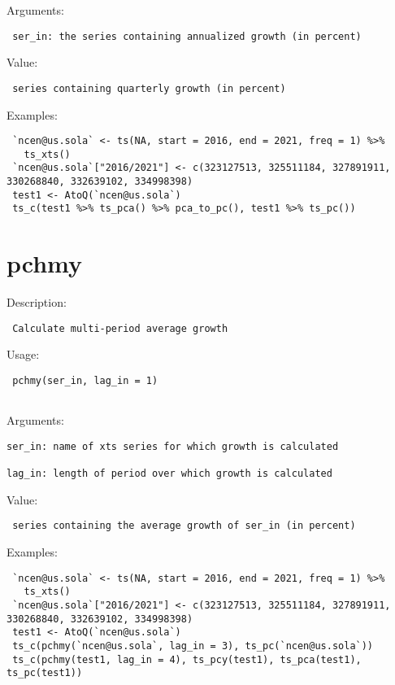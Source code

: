 \documentclass[
  letterpaper,
  DIV=11,
  numbers=noendperiod]{scrreport}
\begin{document}
Arguments:

\begin{verbatim}
 ser_in: the series containing annualized growth (in percent)
\end{verbatim}

Value:

\begin{verbatim}
 series containing quarterly growth (in percent)
\end{verbatim}

Examples:

\begin{verbatim}
 `ncen@us.sola` <- ts(NA, start = 2016, end = 2021, freq = 1) %>% 
   ts_xts()
 `ncen@us.sola`["2016/2021"] <- c(323127513, 325511184, 327891911, 330268840, 332639102, 334998398)
 test1 <- AtoQ(`ncen@us.sola`)
 ts_c(test1 %>% ts_pca() %>% pca_to_pc(), test1 %>% ts_pc())
\end{verbatim}

\hypertarget{pchmy}{%
\section{pchmy}\label{pchmy}}

Description:

\begin{verbatim}
 Calculate multi-period average growth
\end{verbatim}

Usage:

\begin{verbatim}
 pchmy(ser_in, lag_in = 1)
 
\end{verbatim}

Arguments:

\begin{verbatim}
ser_in: name of xts series for which growth is calculated

lag_in: length of period over which growth is calculated
\end{verbatim}

Value:

\begin{verbatim}
 series containing the average growth of ser_in (in percent)
\end{verbatim}

Examples:

\begin{verbatim}
 `ncen@us.sola` <- ts(NA, start = 2016, end = 2021, freq = 1) %>% 
   ts_xts()
 `ncen@us.sola`["2016/2021"] <- c(323127513, 325511184, 327891911, 330268840, 332639102, 334998398)
 test1 <- AtoQ(`ncen@us.sola`)
 ts_c(pchmy(`ncen@us.sola`, lag_in = 3), ts_pc(`ncen@us.sola`))
 ts_c(pchmy(test1, lag_in = 4), ts_pcy(test1), ts_pca(test1), ts_pc(test1))
 
\end{verbatim}
\end{document}
